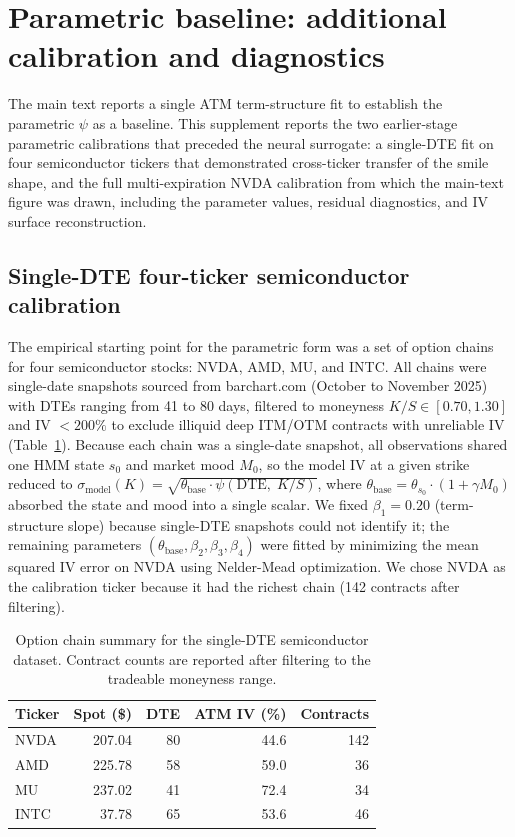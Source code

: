 \section{Parametric baseline: additional calibration and diagnostics}\label{sec:supp_parametric}

The main text reports a single ATM term-structure fit to establish the parametric $\psi$ as a baseline. This supplement reports the two earlier-stage parametric calibrations that preceded the neural surrogate: a single-DTE fit on four semiconductor tickers that demonstrated cross-ticker transfer of the smile shape, and the full multi-expiration NVDA calibration from which the main-text figure was drawn, including the parameter values, residual diagnostics, and IV surface reconstruction.

\subsection{Single-DTE four-ticker semiconductor calibration}

The empirical starting point for the parametric form was a set of option chains for four semiconductor stocks: NVDA, AMD, MU, and INTC. All chains were single-date snapshots sourced from barchart.com (October to November 2025) with DTEs ranging from 41 to 80 days, filtered to moneyness $K/S \in [0.70, 1.30]$ and IV $< 200\%$ to exclude illiquid deep ITM/OTM contracts with unreliable IV (Table~\ref{tab:supp_data}). Because each chain was a single-date snapshot, all observations shared one HMM state $s_0$ and market mood $M_0$, so the model IV at a given strike reduced to $\sigma_{\text{model}}(K) = \sqrt{\theta_{\text{base}} \cdot \psi(\text{DTE},\; K/S)}$, where $\theta_{\text{base}} = \theta_{s_0} \cdot (1 + \gamma M_0)$ absorbed the state and mood into a single scalar. We fixed $\beta_1 = 0.20$ (term-structure slope) because single-DTE snapshots could not identify it; the remaining parameters $(\theta_{\text{base}}, \beta_2, \beta_3, \beta_4)$ were fitted by minimizing the mean squared IV error on NVDA using Nelder-Mead optimization. We chose NVDA as the calibration ticker because it had the richest chain (142 contracts after filtering).

\begin{table}[ht]
\centering
\caption{Option chain summary for the single-DTE semiconductor dataset. Contract counts are reported after filtering to the tradeable moneyness range.}\label{tab:supp_data}
\begin{tabular}{lrrrr}
\toprule
Ticker & Spot (\$) & DTE & ATM IV (\%) & Contracts \\
\midrule
NVDA & 207.04 & 80 & 44.6 & 142 \\
AMD  & 225.78 & 58 & 59.0 & 36 \\
MU   & 237.02 & 41 & 72.4 & 34 \\
INTC &  37.78 & 65 & 53.6 & 46 \\
\bottomrule
\end{tabular}
\end{table}

